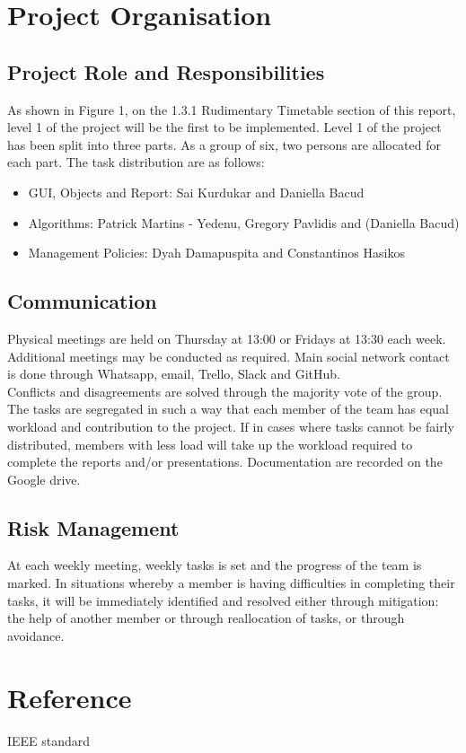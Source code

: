 \documentclass{article} \usepackage{graphicx}
\begin{document}
	\section{Project Organisation}
        \subsection{Project Role and Responsibilities}
            As shown in Figure 1, on the 1.3.1 Rudimentary Timetable section of this 
            report, level 1 of the project will be the first to be implemented. Level 
            1 of the project has been split into three parts. As a group of six, two
             persons are allocated for each part. The task distribution are as follows: 			
            \begin{itemize}
                \item GUI, Objects and Report: Sai Kurdukar and Daniella Bacud
                \item Algorithms: Patrick Martins - Yedenu, Gregory Pavlidis and (Daniella Bacud)
                \item Management Policies: Dyah Damapuspita and Constantinos Hasikos
            \end{itemize}
        \subsection{Communication}
            Physical meetings are held on Thursday at 13:00 or Fridays at 13:30 each week. 
            Additional meetings may be conducted as required. Main social network contact
             is done through Whatsapp, email, Trello, Slack and GitHub.
            \\Conflicts and disagreements are solved through the majority vote of the group.
            \\The tasks are segregated in such a way that each member of the team has equal
             workload and contribution to the project. If in cases where tasks cannot be 
             fairly distributed, members with less load will take up the workload required
              to complete the reports and/or presentations. 		
              Documentation are recorded on the Google drive. 		
        \subsection{Risk Management} 		
            At each weekly meeting, weekly tasks is set and the progress of the team 
            is marked. In situations whereby a member is having difficulties in completing 
            their tasks, it will be immediately identified and resolved either through 
            mitigation: the help of another member or through reallocation of tasks, 
            or through avoidance. 	
        \section{Reference}
            IEEE standard
						
\end{document}
